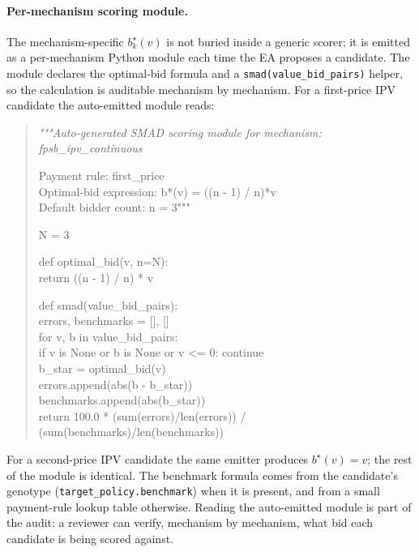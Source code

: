 \documentclass[12pt]{article}
\newcommand{\EA}{EA}
\begin{document}
\paragraph{Per-mechanism scoring module.} The mechanism-specific
$b^\star_k(v)$ is not buried inside a generic scorer; it is emitted
as a per-mechanism Python module each time the \EA{} proposes a
candidate. The module declares the optimal-bid formula and a
\verb|smad(value_bid_pairs)| helper, so the calculation is
auditable mechanism by mechanism. For a first-price IPV candidate
the auto-emitted module reads:
\begin{quote}\small\itshape\ttfamily
"""Auto-generated SMAD scoring module for mechanism: fpsb\_ipv\_continuous

Payment rule: first\_price\\
Optimal-bid expression: b*(v) = ((n - 1) / n)*v\\
Default bidder count: n = 3"""

N = 3

def optimal\_bid(v, n=N):\\
\hspace*{2em}return ((n - 1) / n) * v

def smad(value\_bid\_pairs):\\
\hspace*{2em}errors, benchmarks = [], []\\
\hspace*{2em}for v, b in value\_bid\_pairs:\\
\hspace*{4em}if v is None or b is None or v <= 0: continue\\
\hspace*{4em}b\_star = optimal\_bid(v)\\
\hspace*{4em}errors.append(abs(b - b\_star))\\
\hspace*{4em}benchmarks.append(abs(b\_star))\\
\hspace*{2em}return 100.0 * (sum(errors)/len(errors)) / (sum(benchmarks)/len(benchmarks))
\end{quote}
For a second-price IPV candidate the same emitter produces
$b^\star(v) = v$; the rest of the module is identical. The
benchmark formula comes from the candidate's genotype
(\texttt{target\_policy.benchmark}) when it is present, and from a
small payment-rule lookup table otherwise. Reading the auto-emitted
module is part of the audit: a reviewer can verify, mechanism by
mechanism, what bid each candidate is being scored against.
\end{document}
